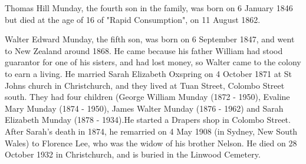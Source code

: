 Thomas Hill Munday, the fourth son in the family, was born on 6 January 1846 but died at the age of 16 of "Rapid Consumption", on 11 August 1862.

Walter Edward Munday, the fifth son, was born on 6 September 1847, and went to New Zealand around 1868. 	He came because his father William had stood guarantor for one of his sisters, and had lost money, so Walter came to the colony to earn a living. He married Sarah Elizabeth Oxspring on 4 October 1871 at St Johns church in Christchurch, and they lived at Tuan Street, Colombo Street south. They had four children (George William Munday (1872 - 1950),
Evaline Mary Munday (1874 - 1950), James Walter Munday (1876 - 1962) and Sarah Elizabeth Munday (1878 - 1934).He started a Drapers shop in Colombo Street.  After Sarah's death in 1874, he remarried on 4 May 1908 (in Sydney, New South Wales) to Florence Lee, who was the widow of his brother Nelson.  He died on 28 October 1932 in	Christchurch, and is buried in the Linwood Cemetery.


